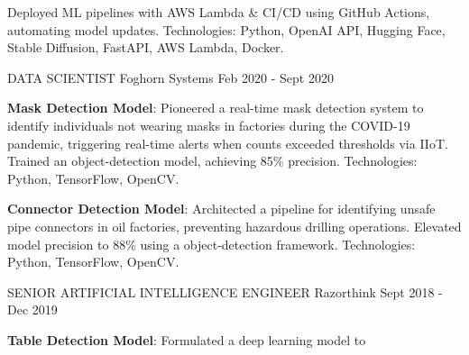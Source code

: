 \begin{cventries}
{\begin{cvitems}
{      \newline
      Deployed ML pipelines with AWS Lambda \& CI/CD using GitHub Actions, automating model updates.
      \newline
      Technologies: Python, OpenAI API, Hugging Face, Stable Diffusion, FastAPI, AWS Lambda, Docker.}
	\end{cvitems}
    }
\vspace{2em} %
  \cventry
    {DATA SCIENTIST} %
    {Foghorn Systems} %
    {} %
    {Feb 2020 - Sept 2020} %
    {
      \begin{cvitems} %
        \item{\textbf{Mask Detection Model}: \newline 
        Pioneered a real-time mask detection system to identify individuals not wearing masks in factories during the COVID-19 pandemic, triggering 
        real-time alerts when counts exceeded thresholds via IIoT. \newline
        Trained an  object-detection model, 
        achieving 85\% precision. \newline Technologies: Python, TensorFlow, OpenCV.}        
        \item{\textbf{Connector Detection Model}: \newline Architected a pipeline for identifying unsafe pipe connectors in oil factories, preventing 
        hazardous drilling operations. \newline
        Elevated model precision to 88\% using a  object-detection framework. \newline
        Technologies: Python, TensorFlow, OpenCV.}
	\end{cvitems}
    }
\vspace{2em} %
  \cventry
    {SENIOR ARTIFICIAL INTELLIGENCE ENGINEER} %
    {Razorthink} %
    {} %
    {Sept 2018 - Dec 2019} %
    {
      \begin{cvitems} %
        \item{\textbf{Table Detection Model}: Formulated a deep learning model to 
}
\end{cvitems}}
\end{cventries}
